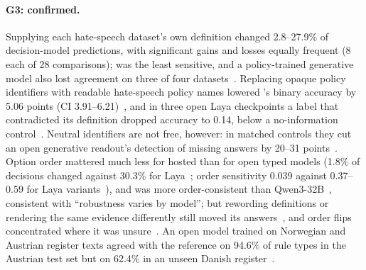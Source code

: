 \paragraph{G3: confirmed.}
Supplying each hate-speech dataset's own definition changed 2.8--27.9\% of decision-model predictions, with significant gains and losses equally frequent (8 each of 28 comparisons); \jev{} was the least sensitive, and a policy-trained generative model also lost agreement on three of four datasets~\cite{arx03324}.
Replacing opaque policy identifiers with readable hate-speech policy names lowered \jev{}'s binary accuracy by 5.06 points (CI 3.91--6.21)~\cite{arx07953}, and in three open Laya checkpoints a label that contradicted its definition dropped accuracy to 0.14, below a no-information control~\cite{arx02586}.
Neutral identifiers are not free, however: in matched controls they cut an open generative readout's detection of missing answers by 20--31 points~\cite{arx03387}.
Option order mattered much less for hosted \jev{} than for open typed models (1.8\% of decisions changed against 30.3\% for Laya~\cite{arx02267}; order sensitivity 0.039 against 0.37--0.59 for Laya variants~\cite{arx02293}), and \jev{} was more order-consistent than Qwen3-32B~\cite{arx09188}, consistent with ``robustness varies by model''; but rewording definitions or rendering the same evidence differently still moved its answers~\cite{arx09937,arx08675}, and order flips concentrated where it was unsure~\cite{arx06625}.
An open model trained on Norwegian and Austrian register texts agreed with the reference on 94.6\% of rule types in the Austrian test set but on 62.4\% in an unseen Danish register~\cite{zen23225893}\zmark{}.

